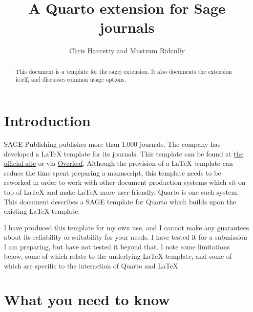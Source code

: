 \documentclass[
  Afour,
  times,
  sageh]{sagej}
\title{A Quarto extension for Sage journals}
\author{Chris Hanretty\affilnum{1} and Mustrum Ridcully\affilnum{2}}
\affiliation{
    \affilnum{1} Royal Holloway, University of London, Department of
Politics, International Relations and Philosophy \\
    \affilnum{2} Unseen University, Arch-Chancellory \\
  }
\begin{document}
\maketitle


\maketitle
\begin{abstract}
This document is a template for the sagej extension. It also documents
the extension itself, and discusses common usage options.
\end{abstract}

\ifdefined\Shaded\renewenvironment{Shaded}{\begin{tcolorbox}[breakable, frame hidden, borderline west={3pt}{0pt}{shadecolor}, sharp corners, interior hidden, boxrule=0pt, enhanced]}{\end{tcolorbox}}\fi

\hypertarget{sec-intro}{%
\section{Introduction}\label{sec-intro}}

SAGE Publishing publishes more than 1,000 journals. The company has
developed a \LaTeX{} template for its journals. This template can be
found at
\href{https://uk.sagepub.com/sites/default/files/sage_latex_template_4.zip}{the
official site} or via
\href{https://www.overleaf.com/latex/templates/tagged/sage}{Overleaf}.
Although the provision of a \LaTeX{} template can reduce the time spent
preparing a manuscript, this template needs to be reworked in order to
work with other document production systems which sit on top of \LaTeX{}
and make \LaTeX{} more user-friendly. Quarto is one such system. This
document describes a SAGE template for Quarto which builds upon the
existing \LaTeX{} template.

I have produced this template for my own use, and I cannot make any
guarantees about its reliability or suitability for your needs. I have
tested it for a submission I am preparing, but have not tested it beyond
that. I note some limitations below, some of which relate to the
underlying LaTeX template, and some of which are specific to the
interaction of Quarto and LaTeX.

\hypertarget{what-you-need-to-know}{%
\section{What you need to know}\label{what-you-need-to-know}}
\end{document}
